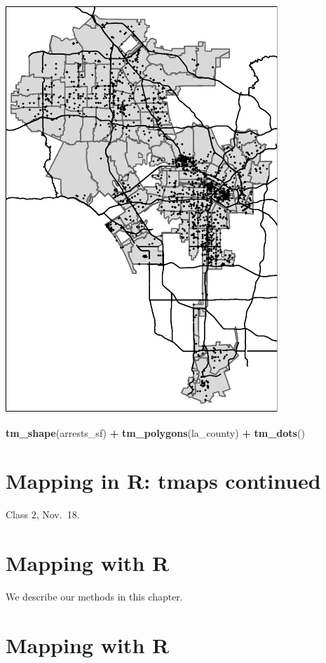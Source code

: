 \documentclass[]{book}
\newenvironment{Shaded}{\begin{snugshade}}{\end{snugshade}}
\newcommand{\KeywordTok}[1]{\textcolor[rgb]{0.13,0.29,0.53}{\textbf{#1}}}
\newcommand{\NormalTok}[1]{#1}
\newcommand{\OperatorTok}[1]{\textcolor[rgb]{0.81,0.36,0.00}{\textbf{#1}}}
\newcommand{\StringTok}[1]{\textcolor[rgb]{0.31,0.60,0.02}{#1}}
\begin{document}
\begin{center}\includegraphics[width=\textwidth]{afam-188r_files/figure-latex/unnamed-chunk-18-1} \end{center}

\begin{Shaded}
\begin{Highlighting}[]
\KeywordTok{tm_shape}\NormalTok{(arrests_sf) }\OperatorTok{+}
\StringTok{  }\KeywordTok{tm_polygons}\NormalTok{(la_county) }\OperatorTok{+}
\StringTok{  }\KeywordTok{tm_dots}\NormalTok{()}
\end{Highlighting}
\end{Shaded}

\hypertarget{mapping-in-r-tmaps-continued}{%
\chapter{Mapping in R: tmaps continued}\label{mapping-in-r-tmaps-continued}}

Class 2, Nov.~18.

\hypertarget{mapping-with-r}{%
\chapter{Mapping with R}\label{mapping-with-r}}

We describe our methods in this chapter.

\hypertarget{mapping-with-r-1}{%
\chapter{Mapping with R}\label{mapping-with-r-1}}


\end{document}
